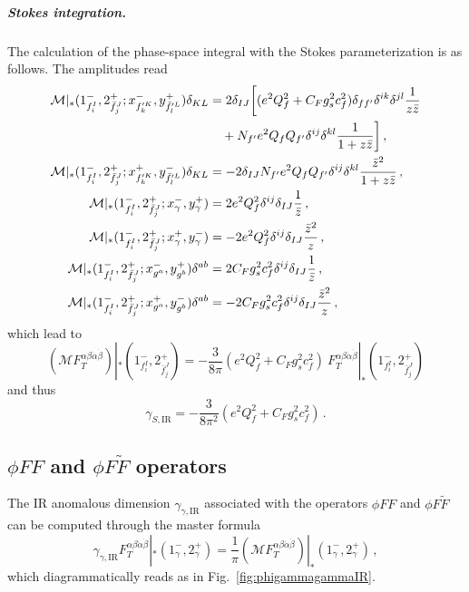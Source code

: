 \subparagraph{Stokes integration.}
The calculation of the phase-space integral with the Stokes parameterization is as follows.
The amplitudes read
\begin{align}
    \mathcal M|_{*} (1_{f_i^I}^{-},2_{\bar f_j^J}^{+}; x_{f_k'^K}^{-},y_{\bar f_l'^L}^{+})\delta_{KL} &= 
2\delta_{IJ}\bigg[(e^2Q_f^2+C_Fg_s^2c_f^2)\delta_{ff'}\delta^{ik}\delta^{jl}\frac{1}{z \bar{z}}\nonumber\\ &\quad + N_{f'} e^2Q_f Q_{f'} \delta^{ij}\delta^{kl}\frac{1}{1+z\bar{z}} \bigg]\,, \\
    \mathcal M|_{*} (1_{f_i^I}^{-},2_{\bar f_j^J}^{+}; x_{f_k'^K}^{+},y_{\bar f_l'^L}^{-})\delta_{KL} &= -2\delta_{IJ} N_{f'} e^2Q_f Q_{f'}\delta^{ij}\delta^{kl}\frac{\bar{z}^2}{1+z\bar{z}}\,, \\
    \mathcal M|_*(1^-_{f_i^I},2^+_{\bar f_j^J};x^-_\gamma,y^+_\gamma) &= 2e^2Q_f^2\delta^{ij}\delta_{IJ}\frac{1}{\bar{z}}\,, \\
    \mathcal M|_*(1^-_{f_i^I},2^+_{\bar f_j^J};x^+_\gamma,y^-_\gamma) &= -2e^2Q_f^2\delta^{ij}\delta_{IJ}\frac{\bar{z}^2}{z}\,, \\
    \mathcal M|_*(1^-_{f_i^I},2^+_{\bar f_j^J};x^-_{g^a},y^+_{g^b})\delta^{ab} &= 2C_Fg_s^2c_f^2\delta^{ij}\delta_{IJ}\frac{1}{\bar{z}}\,, \\
    \mathcal M|_*(1^-_{f_i^I},2^+_{\bar f_j^J};x^+_{g^a},y^-_{g^b})\delta^{ab} &= -2C_Fg_s^2c_f^2\delta^{ij}\delta_{IJ}\frac{\bar{z}^2}{z}\,,
\end{align}
which lead to
\begin{equation}
    (\mathcal M F_T^{\alpha\beta\dot\alpha\dot\beta})|_{*}(1^-_{f_i^I},2^+_{\bar f_j^J}) =  -\frac{3}{8\pi}(e^2Q_f^2+C_Fg_s^2c_f^2) \ F_T^{\alpha\beta\dot\alpha\dot\beta}|_{*}(1^-_{f_i^I},2^+_{\bar f_j^J})
\end{equation}
and thus
\begin{equation}\label{eq:gammaS_IR_stokes}
    \gamma_{S,\text{IR}} = -\frac{3}{8\pi^2}(e^2Q_f^2+C_Fg_s^2c_f^2)\,.
\end{equation}

\subsection{$\phi FF$  and $\phi F\tilde F$ operators}\label{sec:IRphigammagamma}

The IR anomalous dimension $\gamma_{\gamma,\text{IR}}$ associated with the operators $\phi FF$  and $\phi F\tilde F$ can be computed through the master formula
\begin{equation}
    \gamma_{\gamma,\text{IR}} F_T^{\alpha\beta\dot\alpha\dot\beta}|_{*}(1^-_\gamma,2^+_\gamma)=\frac{1}{\pi}(\mathcal M F_T^{\alpha\beta\dot\alpha\dot\beta})|_{*}(1^-_\gamma,2^+_\gamma)\,,
\end{equation}
which diagrammatically reads as in Fig.~\ref{fig:phigammagammaIR}.


